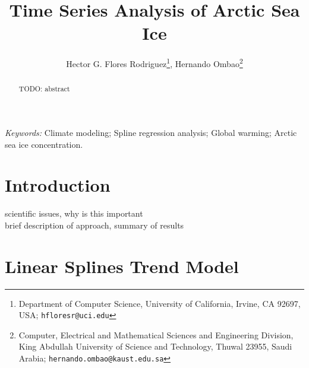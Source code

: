 \documentclass[12pt]{article}
\begin{document}
\date{}
\def\spacingset#1{\renewcommand{\baselinestretch}%
{#1}\small\normalsize} \spacingset{1}


\title{\bf Time Series Analysis of Arctic Sea Ice}
\author{Hector G. Flores Rodriguez\footnote{Department of Computer Science, University of California, Irvine, CA 92697, USA; \texttt{hfloresr@uci.edu}}, Hernando Ombao\footnote{Computer, Electrical and Mathematical Sciences and Engineering Division, King Abdullah University of Science and Technology, Thuwal 23955, Saudi Arabia; \texttt{hernando.ombao@kaust.edu.sa}}}
\maketitle


\bigskip
\begin{abstract}
TODO: abstract
\end{abstract}

\noindent%
{\it Keywords:}  Climate modeling; Spline regression analysis; Global warming; Arctic sea ice concentration.
\vfill


\newpage
\spacingset{2} %
\section{Introduction}

scientific issues, why is this important\\
brief description of approach, summary of results


\section{Linear Splines Trend Model}
\end{document}
